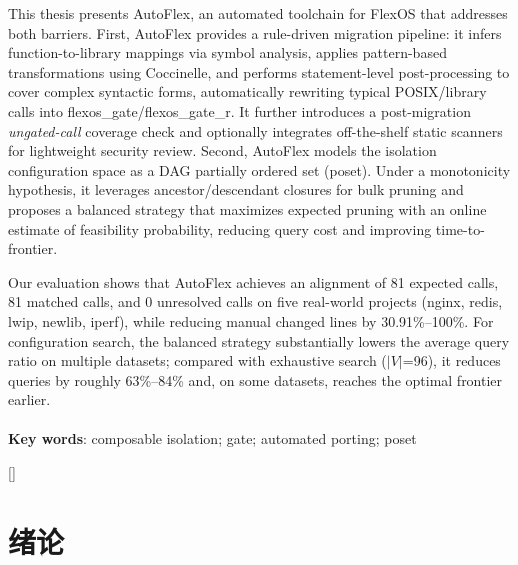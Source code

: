 \documentclass[UTF8,a4paper,12pt,twoside]{ctexart}  %
\begin{document}
This thesis presents AutoFlex, an automated toolchain for
FlexOS that addresses both barriers. First, AutoFlex provides a
rule-driven migration pipeline: it infers function-to-library mappings
via symbol analysis, applies pattern-based transformations using
Coccinelle, and performs statement-level post-processing to cover
complex syntactic forms, automatically rewriting typical POSIX/library
calls into flexos\_gate/flexos\_gate\_r. It further introduces a
post-migration \emph{ungated-call} coverage check and optionally
integrates off-the-shelf static scanners for lightweight security
review. Second, AutoFlex models the isolation configuration space as a
DAG partially ordered set (poset). Under a monotonicity hypothesis, it
leverages ancestor/descendant closures for bulk pruning and proposes a
balanced strategy that maximizes expected pruning with an online
estimate of feasibility probability, reducing query cost and improving
time-to-frontier.

Our evaluation shows that AutoFlex achieves an alignment of 81 expected
calls, 81 matched calls, and 0 unresolved calls on five real-world
projects (nginx, redis, lwip, newlib, iperf), while reducing manual
changed lines by 30.91\%--100\%. For configuration search, the balanced
strategy substantially lowers the average query ratio on multiple
datasets; compared with exhaustive search ($|V|$=96), it
reduces queries by roughly 63\%--84\% and, on some datasets, reaches the
optimal frontier earlier.\\
~\\
\textbf{Key words}: composable isolation; gate; automated porting; poset


\newpage
{}

\renewcommand\contentsname{{目\quad 录}}

\begin{center}
{\tableofcontents
\thispagestyle{fancy}
}
\end{center}

\newpage
{}

[]
\section{绪论}
\end{document}
